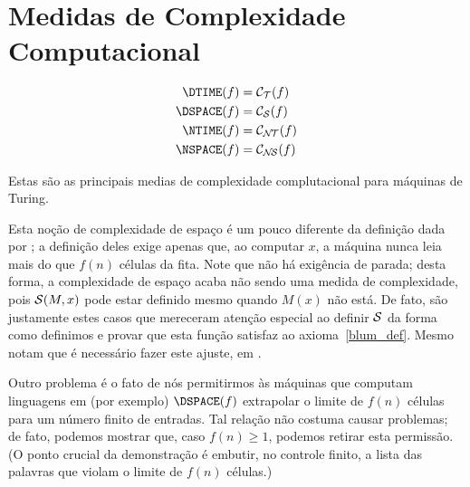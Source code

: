 \section{Medidas de Complexidade Computacional}
\label{medidas_padrao}

\begin{provisionaldefinition}
    \begin{align*}
        \DTIME(f) &= \mathcal C_\PhiDT(f) \\
        \DSPACE(f) &= \mathcal C_\PhiDS(f) \\
        \NTIME(f) &= \mathcal C_\PhiNT(f) \\
        \NSPACE(f) &= \mathcal C_\PhiNS(f)
    \end{align*}
\end{provisionaldefinition}

Estas são as principais medias de complexidade complutacional
para máquinas de Turing.

Esta noção de complexidade de espaço
é um pouco diferente da definição dada por
;
a definição deles exige apenas que,
ao computar $x$,
a máquina nunca leia mais do que $f(n)$ células da fita.
Note que não há exigência de parada;
desta forma,
a complexidade de espaço acaba não sendo uma medida de complexidade,
pois ${\mathcal{S}}(M, x)$ pode estar definido
mesmo quando $M(x)$ não está.
De fato,
são justamente estes casos que mereceram
atenção especial ao definir ${\mathcal{S}}$
da forma como definimos
e provar que esta função satisfaz ao axioma~\ref{blum_def}.
Mesmo 
notam que é necessário fazer este ajuste,
em \cite[p.~313]{HopcroftUllman1979}.

Outro problema é o fato de nós permitirmos
às máquinas que computam linguagens em
(por exemplo) $\DSPACE(f)$
extrapolar o limite de $f(n)$ células
para um número finito de entradas.
Tal relação não costuma causar problemas;
de fato,
podemos mostrar que,
caso $f(n) \geq 1$,
podemos retirar esta permissão.
(O ponto crucial da demonstração é embutir,
no controle finito,
a lista das palavras que violam o limite de $f(n)$ células.)

